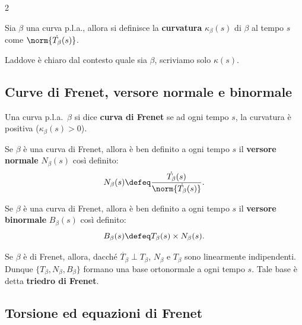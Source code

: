 \begin{multicols*}{2}
    \begin{definition}[Curvatura]
        Sia $\beta$ una curva p.l.a., allora si definisce la
        \textbf{curvatura} $\kappa_\beta(s)$ di $\beta$ al tempo $s$ come
        $\norm{\dot{T_\beta}(s)}$. \smallskip

        Laddove è chiaro dal contesto quale sia $\beta$, scriviamo solo $\kappa(s)$.
    \end{definition}

    \subsection{Curve di Frenet, versore normale e binormale}

    \begin{definition}
        Una curva p.l.a.~$\beta$ si dice \textbf{curva di Frenet} se
        ad ogni tempo $s$, la curvatura è positiva ($\kappa_\beta(s) > 0$).
    \end{definition}

    \begin{definition}
        Se $\beta$ è una curva di Frenet, allora è ben definito
        a ogni tempo $s$ il \textbf{versore normale} $N_\beta(s)$ così
        definito:
        \[
            N_\beta(s) \defeq \frac{\dot{T_\beta}(s)}{\norm{\dot{T_\beta}(s)}}.
        \]
    \end{definition}

    \begin{definition}
        Se $\beta$ è una curva di Frenet, allora è ben definito
        a ogni tempo $s$ il \textbf{versore binormale} $B_\beta(s)$ così
        definito:
        \[
            B_\beta(s) \defeq T_\beta(s) \times N_\beta(s).
        \]
    \end{definition}

    \begin{remark}
        Se $\beta$ è di Frenet, allora, dacché $\dot{T_\beta} \perp T_\beta$,
        $N_\beta$ e $T_\beta$ sono linearmente indipendenti. Dunque
        $\{T_\beta, N_\beta, B_\beta\}$ formano una base ortonormale a ogni tempo
        $s$. Tale base è detta \textbf{triedro di Frenet}.
    \end{remark}

    \subsection{Torsione ed equazioni di Frenet}


\end{multicols*}

